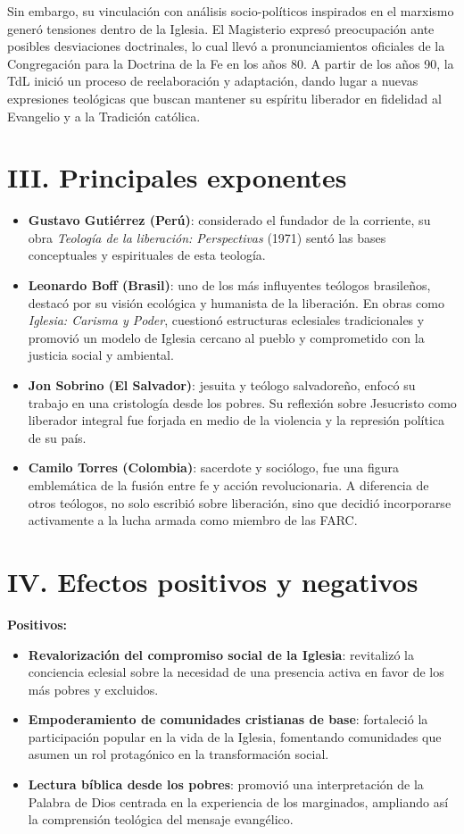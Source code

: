\documentclass[12pt]{article}
\begin{document}
Sin embargo, su vinculación con análisis socio-políticos inspirados en el marxismo generó tensiones dentro de la Iglesia. El Magisterio expresó preocupación ante posibles desviaciones doctrinales, lo cual llevó a pronunciamientos oficiales de la Congregación para la Doctrina de la Fe en los años 80. A partir de los años 90, la TdL inició un proceso de reelaboración y adaptación, dando lugar a nuevas expresiones teológicas que buscan mantener su espíritu liberador en fidelidad al Evangelio y a la Tradición católica.

\section*{III. Principales exponentes}
\begin{itemize}
    \item \textbf{Gustavo Gutiérrez (Perú)}: considerado el fundador de la corriente, su obra \textit{Teología de la liberación: Perspectivas} (1971) sentó las bases conceptuales y espirituales de esta teología.
    \item \textbf{Leonardo Boff (Brasil)}: uno de los más influyentes teólogos brasileños, destacó por su visión ecológica y humanista de la liberación. En obras como \textit{Iglesia: Carisma y Poder}, cuestionó estructuras eclesiales tradicionales y promovió un modelo de Iglesia cercano al pueblo y comprometido con la justicia social y ambiental.
    \item \textbf{Jon Sobrino (El Salvador)}: jesuita y teólogo salvadoreño, enfocó su trabajo en una cristología desde los pobres. Su reflexión sobre Jesucristo como liberador integral fue forjada en medio de la violencia y la represión política de su país.
    \item \textbf{Camilo Torres (Colombia)}: sacerdote y sociólogo, fue una figura emblemática de la fusión entre fe y acción revolucionaria. A diferencia de otros teólogos, no solo escribió sobre liberación, sino que decidió incorporarse activamente a la lucha armada como miembro de las FARC.
\end{itemize}

\section*{IV. Efectos positivos y negativos}
\textbf{Positivos:}
\begin{itemize}
    \item \textbf{Revalorización del compromiso social de la Iglesia}: revitalizó la conciencia eclesial sobre la necesidad de una presencia activa en favor de los más pobres y excluidos.
    \item \textbf{Empoderamiento de comunidades cristianas de base}: fortaleció la participación popular en la vida de la Iglesia, fomentando comunidades que asumen un rol protagónico en la transformación social.
    \item \textbf{Lectura bíblica desde los pobres}: promovió una interpretación de la Palabra de Dios centrada en la experiencia de los marginados, ampliando así la comprensión teológica del mensaje evangélico.
\end{itemize}
\end{document}
